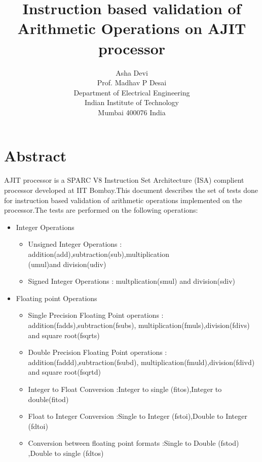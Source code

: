 \documentclass[12pt]{article}
\begin{document}
\title{Instruction based validation of Arithmetic Operations on AJIT processor}
\author{Asha Devi\\Prof. Madhav P Desai \\ Department of Electrical Engineering \\ Indian Institute of Technology \\
	Mumbai 400076 India}
\date{}
\maketitle
\section*{Abstract}
AJIT processor is a SPARC V8 Instruction Set Architecture (ISA) complient processor developed at IIT Bombay.This document describes the set of tests done for instruction based validation of arithmetic operations implemented on the processor.The tests are performed on the following operations:
\begin{itemize}
  \item Integer Operations

	\begin{itemize}

		\item Unsigned Integer Operations : addition(add),subtraction(sub),multiplication\\
(umul)and division(udiv)

	
		\item Signed Integer Operations : multplication(smul) and division(sdiv)
	 \end{itemize}
  \item Floating point Operations
	\begin{itemize}
		\item Single Precision Floating Point operations : addition(fadds),subtraction(fsubs),
multiplication(fmuls),division(fdivs) and square root(fsqrts)
		\item Double Precision Floating Point operations : addition(faddd),subtraction(fsubd),
multiplication(fmuld),division(fdivd) and square root(fsqrtd)
		\item Integer to Float Conversion :Integer to single (fitos),Integer to double(fitod)
		\item Float to Integer Conversion :Single to Integer (fstoi),Double to Integer (fdtoi) 
		\item Conversion between floating point formats :Single to Double (fstod) ,Double to single (fdtos)
	\end{itemize}
\end{itemize}
\end{document}
